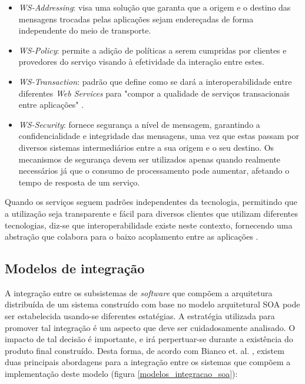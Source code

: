 \begin{itemize}
\item \textit{WS-Addressing}: visa uma solução que garanta que a origem e o destino das mensagens trocadas pelas aplicações sejam endereçadas de forma independente do meio de transporte.
\item \textit{WS-Policy}: permite a adição de políticas a serem cumpridas por clientes e provedores do serviço visando à efetividade da interação entre estes.
\item \textit{WS-Transaction}: padrão que define como se dará a interoperabilidade entre diferentes \textit{Web Services} para "compor a qualidade de serviços transacionais entre aplicações" \cite{oliveira_interoperabilidade}.
\item \textit{WS-Security}: fornece segurança a nível de mensagem, garantindo a confidencialidade e integridade das mensagens, uma vez que estas passam por diversos sistemas intermediários entre a sua origem e o seu destino. Os mecanismos de segurança devem ser utilizados apenas quando realmente necessários já que o consumo de processamento pode aumentar, afetando o tempo de resposta de um serviço.
\end{itemize}

Quando os serviços seguem padrões independentes da tecnologia, permitindo que a utilização seja transparente e fácil para diversos clientes que utilizam diferentes tecnologias, diz-se que interoperabilidade existe neste contexto, fornecendo uma abstração que colabora para o baixo acoplamento entre as aplicações \cite{oliveira_interoperabilidade}.

\subsection{Modelos de integração}
A integração entre os subsistemas de \textit{software} que compõem a arquitetura distribuída de um sistema construído com base no modelo arquitetural SOA pode ser estabelecida usando-se diferentes estatégias. A estratégia utilizada para promover tal integração é um aspecto que deve ser cuidadosamente analisado. O impacto de tal decisão é importante, e irá perpertuar-se durante a existência do produto final construído. Desta forma, de acordo com Bianco et. al. \cite{Bianco2007}, existem duas principais abordagens para a integração entre os sistemas que compõem a implementação deste modelo (figura \ref{modelos_integracao_soa}):

